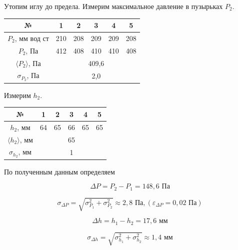 \documentclass[a4paper,12pt]{article} %
\begin{document}
{\medskip


\noindent Утопим иглу до предела. Измерим максимальное давление в пузырьках $P_{2}$.

\medskip

\begin{tabular}{|c|c|c|c|c|c|}
\hline 
№ & 1 & 2 & 3 & 4 & 5 \\ 
\hline 
$P_{2}$, мм вод ст & 210 & 208 & 209 & 209 & 208 \\ 
\hline 
$P_{2}$, Па & 412 & 408 & 410 & 410 & 408 \\ 
\hline 
$\langle P_{2} \rangle$, Па & \multicolumn{5}{c|}{409,6} \\ 
\hline 
$\sigma_{P_{2}} $, Па  & \multicolumn{5}{c|}{2,0} \\ 
\hline 
\end{tabular}

\medskip

\noindent Измерим $h_{2}$.

\medskip

\begin{tabular}{|c|c|c|c|c|c|}
\hline 
№ & 1 & 2 & 3 & 4 & 5 \\ 
\hline 
$h_{2}$, мм & 64 & 65 & 66 & 65 & 65 \\ 
\hline 
$\langle h_{2} \rangle$, мм & \multicolumn{5}{c|}{65} \\ 
\hline 
$\sigma_{h_{2}}$, мм & \multicolumn{5}{c|}{1} \\ 
\hline 
\end{tabular} 

\medskip

\noindent По полученным данным определяем

\medskip
 
\begin{equation}
\Delta P = P_2 - P_1 = 148,6 \text{ Па}
\end{equation}

\medskip

\begin{equation}
\sigma_{\Delta P} = \sqrt{\sigma^2_{P_1}+\sigma^2_{P_2}} \approx 2,8 \text{ Па}, (\varepsilon_{\Delta P} = 0,02\text{ Па})
\end{equation}

\medskip

\begin{equation}
\Delta h = h_{1} - h_{2} = 17,6 \text{ мм}
\end{equation}
 
\medskip

\begin{equation}
\sigma_{\Delta h} = \sqrt{\sigma^2_{h_1}+\sigma^2_{h_2}} \approx 1,4 \text{ мм}
\end{equation}

}
\end{document}
